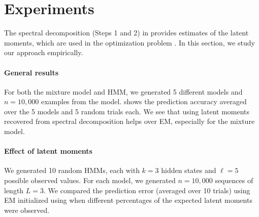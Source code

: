 \section{Experiments} \label{sec:experiments}

The spectral decomposition (Steps 1 and 2) in 
provides estimates of the latent moments,
which are used in the optimization problem .
In this section, we study our approach empirically.

\paragraph{General results}

For both the mixture model and HMM,
we generated 5 different models and $n=10,000$ examples from the model.
 shows the prediction accuracy averaged over the 5 models and 5
random trials each.
We see that using latent moments recovered from spectral decomposition
helps over EM, especially for the mixture model.

\paragraph{Effect of latent moments}

We generated 10 random HMMs,
each with $k=3$ hidden states and $\ell=5$ possible observed values. 
For each model, we generated $n=10,000$ sequences of length $L=3$.
We compared the prediction error (averaged over 10 trials) using EM
initialized using  when different percentages of the expected
latent moments were observed.


